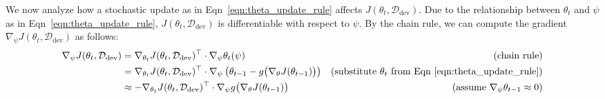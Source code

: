 We now analyze how a stochastic update as in Eqn~\ref{eqn:theta_update_rule} affects $J(\theta_t, \mathcal{D}_{\text{dev}})$. 
Due to the relationship between $\theta_t$ and $\psi$ as in Eqn~\ref{eqn:theta_update_rule}, $J(\theta_t, \mathcal{D}_\text{dev})$ is differentiable with respect to $\psi$. 
By the chain rule, we can compute the gradient $\nabla_\psi J(\theta_t, \mathcal{D}_\text{dev})$ as follows:
\begin{equation}
  \label{eqn:two_step_update}
  \begin{aligned}
    \nabla_\psi J(\theta_t, \mathcal{D}_\text{dev})
      &= \nabla_{\theta_t} J(\theta_t, \mathcal{D}_\text{dev})^\top \cdot \nabla_\psi \theta_t(\psi) &\text{(chain rule)} \\
      &= \nabla_{\theta_t} J(\theta_t, \mathcal{D}_\text{dev})^\top \cdot \nabla_\psi \left( \theta_{t-1} - g\big( \nabla_\theta J(\theta_{t-1}) \big) \right) &\text{(substitute $\theta_t$ from Eqn~\ref{eqn:theta_update_rule})} \\
      &\approx -\nabla_{\theta_t} J(\theta_t, \mathcal{D}_\text{dev})^\top \cdot \nabla_\psi g\big( \nabla_\theta J(\theta_{t-1}) \big) &\text{(assume $\nabla_\psi \theta_{t-1} \approx 0$)} %
  \end{aligned}
\end{equation}
